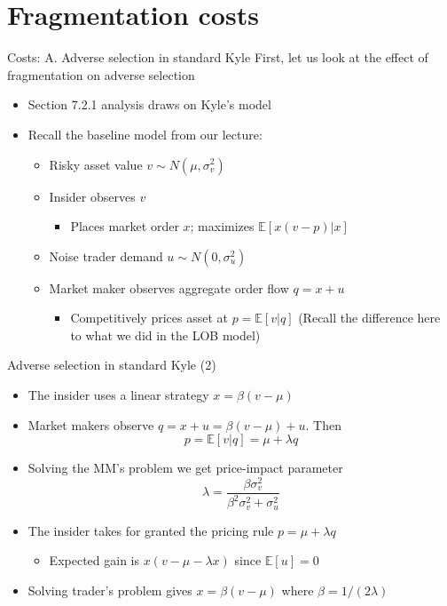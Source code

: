 \documentclass[english,10pt
,aspectratio=169
]{beamer}
\begin{document}
\section{Fragmentation costs}

\begin{frame}{Costs: A. Adverse selection in standard Kyle}
	First, let us look at the effect of fragmentation on adverse selection
	\begin{itemize}
		\item Section 7.2.1 analysis draws on Kyle's model
		\item Recall the baseline model from our lecture:
		\begin{itemize}
			\item Risky asset value $v \sim N(\mu,\sigma^{2}_{v})$
			\item Insider observes $v$
			\begin{itemize}
				\item Places market order $x$; maximizes $\mathbb{E}[x(v-p)|x]$
			\end{itemize}
			\item Noise trader demand $u \sim N(0, \sigma^{2}_{u})$
			\item Market maker observes aggregate order flow $q = x + u$
			\begin{itemize}
				\item Competitively prices asset at $p = \mathbb{E}[v|q]$
				(Recall the difference here to what we did in the LOB model)
			\end{itemize}
		\end{itemize}
	\end{itemize}
\end{frame}


\begin{frame}{Adverse selection in standard Kyle (2)}
	\begin{itemize}
		\item The insider uses a linear strategy $x=\beta(v-\mu)$
		\item Market makers observe $q=x+u=\beta(v-\mu) + u$. Then
		\[
		p=\mathbb{E}[v|q]=\mu + \lambda q
		\]
		\item Solving the MM's problem we get price-impact parameter
		\[
		\lambda = \frac{\beta \sigma^{2}_{v}}{\beta^{2} \sigma^{2}_{v}+\sigma^{2}_{u}}
		\]
		\item The insider takes for granted the pricing rule $p=\mu+\lambda q$
		\begin{itemize}
			\item Expected gain is $x(v-\mu-\lambda x)$ since $\mathbb{E}[u]=0$
		\end{itemize}
		\item Solving trader's problem gives $x=\beta(v-\mu)$ where $\beta=1/(2\lambda)$
	\end{itemize}
\end{frame}
\end{document}
